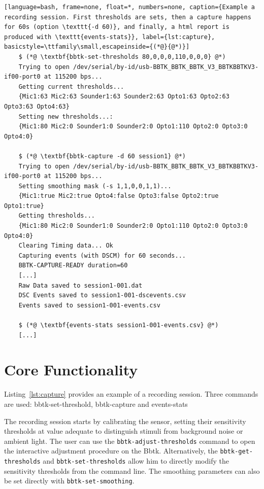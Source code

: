 \documentclass[jou,a4paper]{apa7}
\begin{document}
\begin{lstlisting}[language=bash, frame=none, float=*, numbers=none, caption={Example a recording session. First thresholds are sets, then a capture happens for 60s (option \texttt{-d 60)}, and finally, a html report is produced with \texttt{events-stats}}, label={lst:capture}, basicstyle=\ttfamily\small,escapeinside={(*@}{@*)}]
	$ (*@ \textbf{bbtk-set-thresholds 80,0,0,0,110,0,0,0} @*)
	Trying to open /dev/serial/by-id/usb-BBTK_BBTK_BBTK_V3_BBTKBBTKV3-if00-port0 at 115200 bps...
	Getting current thresholds...
	{Mic1:63 Mic2:63 Sounder1:63 Sounder2:63 Opto1:63 Opto2:63 Opto3:63 Opto4:63}
	Setting new thresholds...: 
	{Mic1:80 Mic2:0 Sounder1:0 Sounder2:0 Opto1:110 Opto2:0 Opto3:0 Opto4:0}
	
	$ (*@ \textbf{bbtk-capture -d 60 session1} @*) 	
	Trying to open /dev/serial/by-id/usb-BBTK_BBTK_BBTK_V3_BBTKBBTKV3-if00-port0 at 115200 bps...
	Setting smoothing mask (-s 1,1,0,0,1,1)...
	{Mic1:true Mic2:true Opto4:false Opto3:false Opto2:true Opto1:true}
	Getting thresholds...
	{Mic1:80 Mic2:0 Sounder1:0 Sounder2:0 Opto1:110 Opto2:0 Opto3:0 Opto4:0}
	Clearing Timing data... Ok
	Capturing events (with DSCM) for 60 seconds... 
	BBTK-CAPTURE-READY duration=60
	[...]	
	Raw Data saved to session1-001.dat
	DSC Events saved to session1-001-dscevents.csv
	Events saved to session1-001-events.csv
	
	$ (*@ \textbf{events-stats session1-001-events.csv} @*)
	[...]
\end{lstlisting}

\section{Core Functionality}
\label{sec:functionality}

Listing~\ref{lst:capture} provides an example of a recording session. Three commands are used: bbtk-set-threshold, bbtk-capture and events-stats


The recording session starts by calibrating the sensor, setting their sensitivity thresholds at value adequate to
distinguish stimuli from background noise or ambient light. The user can use the \texttt{bbtk-adjust-thresholds} command to open the interactive adjustment procedure on the Bbtk. Alternatively, the  \texttt{bbtk-get-thresholds} and 
\texttt{bbtk-set-thresholds} allow him to directly modify the sensitivity thresholds from the command line. The smoothing parameters can also be set directly with \texttt{bbtk-set-smoothing}.
\end{document}
